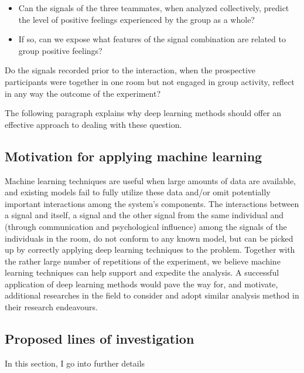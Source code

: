 \documentclass[a4paper, 11pt]{article}      %
\begin{document}
\begin{itemize}
    \item Can the signals of the three teammates, when analyzed collectively, predict the level of positive feelings experienced by the group as a whole? 
    \item If so, can we expose what features of the signal combination are related to group positive feelings?
\end{itemize}


Do the signals recorded prior to the interaction, when the prospective participants were together in one room but not engaged in group activity, reflect in any way the outcome of the experiment?


The following paragraph explains why deep learning methods should offer an effective approach to dealing with these question.

\subsection{Motivation for applying machine learning}
Machine learning techniques are useful when large amounts of data are available, and existing models fail to fully utilize these data and/or omit potentially important interactions among the system's components. The interactions between a signal and itself, a signal and the other signal from the same individual and (through communication and psychological influence) among the signals of the individuals in the room, do not conform to any known model, but can be picked up by correctly applying deep learning techniques to the problem. Together with the rather large number of repetitions of the experiment, we believe machine learning techniques can help support and expedite the analysis. A successful application of deep learning methods would pave the way for, and motivate, additional researches in the field to consider and adopt similar analysis method in their research endeavours.
\subsection{Proposed lines of investigation}
In this section, I go into further details 
\end{document}
